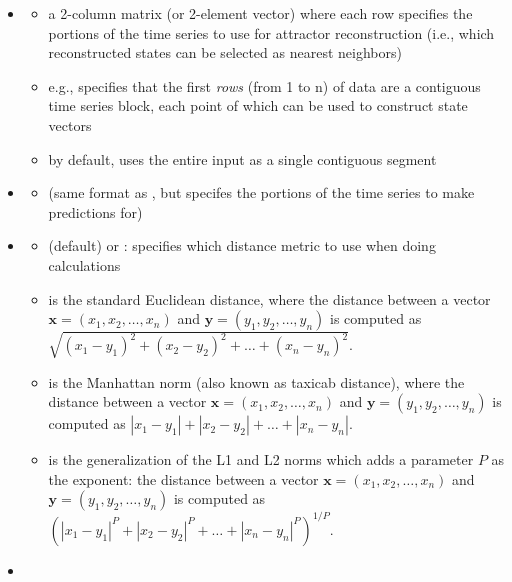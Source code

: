 \documentclass[article]{jss}
\begin{document}
\begin{itemize}
\item {}
  \begin{itemize}
  \item a 2-column matrix (or 2-element vector) where each row specifies the portions of the time series to use for attractor reconstruction (i.e., which reconstructed states can be selected as nearest neighbors)
  \item e.g.,  specifies that the first  \emph{rows} (from 1 to n) of data are a contiguous time series block, each point of which can be used to construct state vectors
  \item by default,  uses the entire input as a single contiguous segment
  \end{itemize}
\item {}
  \begin{itemize}
  \item (same format as , but specifes the portions of the time series to make predictions for)
  \end{itemize}
\item {}
  \begin{itemize}
  \item  {} (default) or : specifies which distance metric to use when doing calculations
  \item {} is the standard Euclidean distance, where the distance between a vector $\mathbf{x} = \left(x_1, x_2, \dots, x_n \right)$ and $\mathbf{y} = \left( y_1, y_2, \dots, y_n \right)$ is computed as \\$\sqrt{(x_1 - y_1)^2 + (x_2 - y_2)^2 + \dots + (x_n - y_n)^2}$.
  \item {} is the Manhattan norm (also known as taxicab distance), where the distance between a vector $\mathbf{x} = \left( x_1, x_2, \dots, x_n \right)$ and $\mathbf{y} = \left( y_1, y_2, \dots, y_n \right)$ is computed as $|x_1 - y_1| + |x_2 - y_2| + \dots + |x_n - y_n|$.
  \item {} is the generalization of the L1 and L2 norms which adds a parameter $P$ as the exponent: the distance between a vector $\mathbf{x} = \left( x_1, x_2, \dots, x_n \right)$ and $\mathbf{y} = \left(y_1, y_2, \dots, y_n \right)$ is computed as ${\left(\left|x_1 - y_1\right|^P + \left|x_2 - y_2\right|^P + \dots + \left|x_n - y_n\right|^P\right)^{1/P}}$.
  \end{itemize}
\item {}

\end{itemize}
\end{document}
